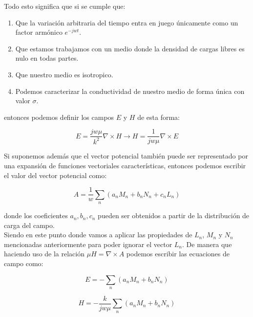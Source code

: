 \documentclass{article}
\begin{document}
\newpage

Todo esto significa que si se cumple que:
\begin{enumerate}
    \item Que la variación arbitraria del tiempo entra en juego únicamente como un factor armónico $e^{-jwt}$.
    \item Que estamos trabajamos con un medio donde la densidad de cargas libres es nulo en todas partes.
    \item   Que nuestro medio es isotropico.
    \item Podemos caracterizar la conductividad de nuestro medio de forma única con valor $\sigma$.

\end{enumerate}

entonces podemos definir los campos $E$ y $H$ de esta forma:

\begin{equation}
E = \frac{jw\mu}{k^2}\nabla \times H\xrightarrow{}   H= \frac{1}{jw\mu}\nabla \times E
\label{campo-EyH-cumpliendo-simplificacion-con-MnyNn}
\end{equation}

Si suponemos además que el vector potencial también puede ser representado por una expansión de funciones vectoriales características, entonces podemos escribir el valor del vector potencial como:

\begin{equation}
A = \frac{1}{w}\sum_{n}(a_{n}M_{n}+b_{n}N_{n}+c_{n}L_{n})
\label{vector-potencial-cumpliendo-simplificacion-con-MnyNn}
\end{equation}

donde los coeficientes $a_{n}, b_{n}, c_{n}$ pueden ser obtenidos a partir de la distribución de carga del campo.
\\

Siendo en este punto donde vamos a aplicar las propiedades de $L_{n}$, $M_{n}$ y $N_{n}$ mencionadas anteriormente para poder ignorar el vector $L_{n}$. De manera que haciendo uso de la relación $\mu H = \nabla \times A$ podemos escribir las ecuaciones de campo como:


    \begin{equation}
        E = - \sum_{n}(a_{n}M_{n}+b_{n}N_{n})
    \label{eq-E general usando Mn y Nn}
    \end{equation}

    \begin{equation}
         H = - \frac{k}{jw\mu}\sum_{n}(a_{n}M_{n}+b_{n}N_{n})
    \label{eq-H general usando Mn y Nn}
    \end{equation}  
\end{document}
